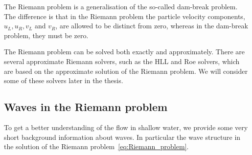 The Riemann problem is a generalisation of the so-called dam-break problem.
The difference is that in the Riemann problem the particle velocity components, $u_L, u_R, v_L$ and $v_R$, are allowed to be distinct from zero, whereas in the dam-break problem, they must be zero.

The Riemann problem can be solved both exactly and approximately.
There are several approximate Riemann solvers, such as the HLL and Roe solvers, which are based on the approximate solution of the Riemann problem.
We will consider some of these solvers later in the thesis.

\subsection{Waves in the Riemann problem}
To get a better understanding of the flow in shallow water, we provide some very short background information about waves.
In particular the wave structure in the solution of the Riemann problem~\eqref{eq:Riemann_problem}.

